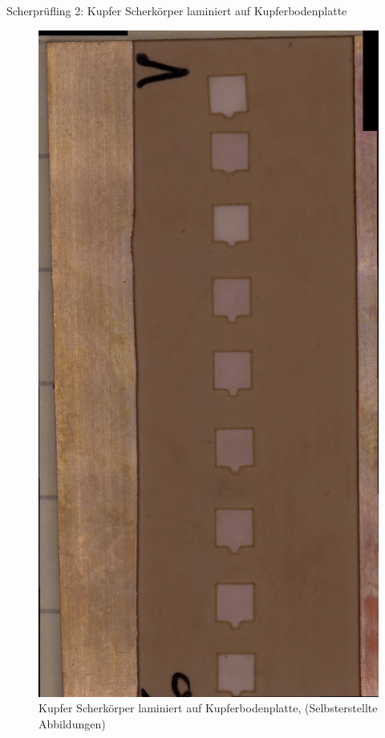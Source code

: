 Scherprüfling 2: Kupfer Scherkörper laminiert auf Kupferbodenplatte
\vspace{0.1cm}
\begin{figure}[h]
    \centering
    \includegraphics[scale=0.06, angle=90]{Bilder/Laminieren_Bodenplatte_Gesamt.jpg}
    \caption{Kupfer Scherkörper laminiert auf Kupferbodenplatte, (Selbsterstellte Abbildungen)}
    \vspace{0.2cm}
    \label{Abb.3: Kupfer Scherkörper laminiert auf Kupferbodenplatte}
\end{figure}
\newpage
